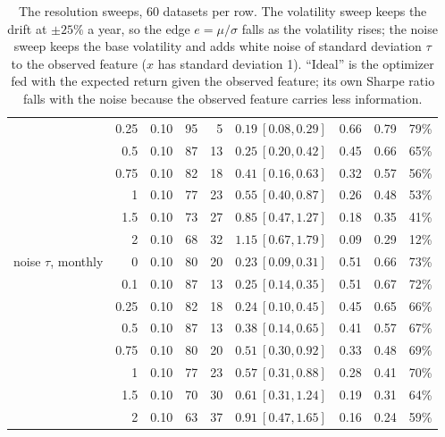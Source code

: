 \documentclass[11pt,a4paper]{article}
\newcommand{\1}{\mathbf{1}}
\begin{document}
\begin{table}[H]
\begin{tabular}{@{}l r r rr r rr r@{}}
 & 0.25 & 0.10 & 95 & 5 & $0.19\ [0.08, 0.29]$ & 0.66 & 0.79 & 79\%\\
 & 0.5 & 0.10 & 87 & 13 & $0.25\ [0.20, 0.42]$ & 0.45 & 0.66 & 65\%\\
 & 0.75 & 0.10 & 82 & 18 & $0.41\ [0.16, 0.63]$ & 0.32 & 0.57 & 56\%\\
 & 1 & 0.10 & 77 & 23 & $0.55\ [0.40, 0.87]$ & 0.26 & 0.48 & 53\%\\
 & 1.5 & 0.10 & 73 & 27 & $0.85\ [0.47, 1.27]$ & 0.18 & 0.35 & 41\%\\
 & 2 & 0.10 & 68 & 32 & $1.15\ [0.67, 1.79]$ & 0.09 & 0.29 & 12\%\\
\midrule
noise $\tau$, monthly & 0 & 0.10 & 80 & 20 & $0.23\ [0.09, 0.31]$ & 0.51 & 0.66 & 73\%\\
 & 0.1 & 0.10 & 87 & 13 & $0.25\ [0.14, 0.35]$ & 0.51 & 0.67 & 72\%\\
 & 0.25 & 0.10 & 82 & 18 & $0.24\ [0.10, 0.45]$ & 0.45 & 0.65 & 66\%\\
 & 0.5 & 0.10 & 87 & 13 & $0.38\ [0.14, 0.65]$ & 0.41 & 0.57 & 67\%\\
 & 0.75 & 0.10 & 80 & 20 & $0.51\ [0.30, 0.92]$ & 0.33 & 0.48 & 69\%\\
 & 1 & 0.10 & 77 & 23 & $0.57\ [0.31, 0.88]$ & 0.28 & 0.41 & 70\%\\
 & 1.5 & 0.10 & 70 & 30 & $0.61\ [0.31, 1.24]$ & 0.19 & 0.31 & 64\%\\
 & 2 & 0.10 & 63 & 37 & $0.91\ [0.47, 1.65]$ & 0.16 & 0.24 & 59\%\\
\bottomrule
\end{tabular}
\caption{The resolution sweeps, 60 datasets per row. The volatility sweep keeps the drift at $\pm25\%$ a year, so the edge $e=\mu/\sigma$ falls as the volatility rises; the noise sweep keeps the base volatility and adds white noise of standard deviation $\tau$ to the observed feature ($x$ has standard deviation 1). ``Ideal'' is the optimizer fed with the expected return given the observed feature; its own Sharpe ratio falls with the noise because the observed feature carries less information.}
\label{tab:resolution}
\end{table}
\end{document}
